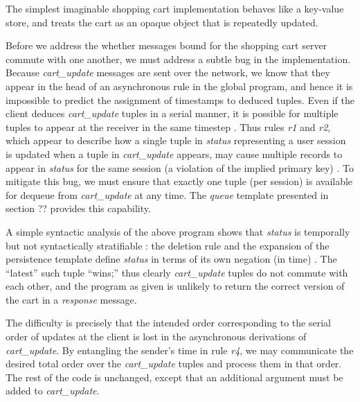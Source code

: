 The simplest imaginable shopping cart implementation behaves like a key-value store,
and treats the cart as an opaque object that is repeatedly updated.  

Before we address the whether messages bound for the shopping cart server commute 
with one another, we must address a subtle bug in the implementation.  Because {\em cart\_update}
messages are sent over the network, we know that they appear in the head of an asynchronous 
rule in the global program, and hence it is impossible to predict the assignment of timestamps
to deduced tuples.  Even if the client deduces {\em cart\_update} tuples in a serial manner, it
is possible for multiple tuples to appear at the receiver in the same timestep .  Thus rules {\em r1} 
and {\em r2}, which appear to describe how a single tuple in {\em status} representing a user
session is updated when a tuple in {\em cart\_update} appears, may cause multiple records
to appear in {\em status} for the same session (a violation of the implied primary key) .
To mitigate this bug, we must ensure that exactly one tuple (per session) is available for dequeue
from {\em cart\_update} at any time.  The \emph{queue} template presented in section ?? 
provides this capability.


A simple syntactic analysis of the above program shows that {\em status} 
is temporally but not syntactically stratifiable : the deletion rule and the expansion of the
persistence template define {\em status} in terms of its own negation (in time) .  The ``latest''
such tuple ``wins;'' thus clearly {\em cart\_update} tuples do not commute with each other,
and the program as given is unlikely to return the correct version of the cart in a {\em response}
message.

The difficulty is precisely that the intended order corresponding to the serial order of updates
at the client is lost in the asynchronous derivations of {\em cart\_update}.  By entangling
the sender's time in rule  {\em r4}, we may communicate the desired total order over 
the {\em cart\_update} tuples and process them in that order.  The rest of the code is unchanged,
except that an additional argument must be added to {\em cart\_update}.

